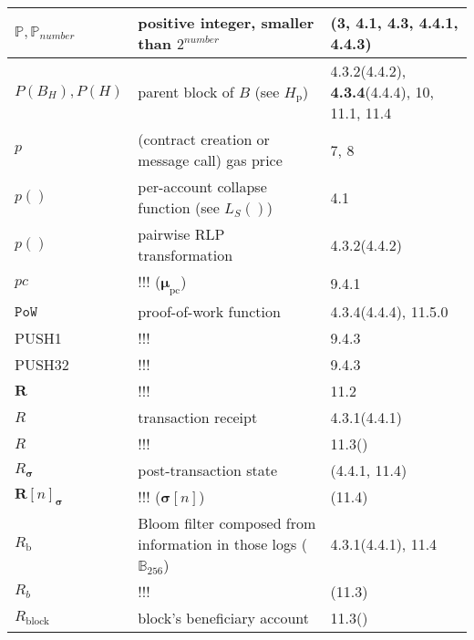 \documentclass[9pt,oneside]{amsart}
\newcommand{\reff}[1]{{\footnotesize #1}}
\begin{document}
\begin{longtabu}{X[1.2lm] X[3] X}
$\mathbb{P}, \mathbb{P}_{number}$ &
positive integer, smaller than $2^{number}$ &
\reff{(3, 4.1, \textbf{4.3}, 4.4.1, 4.4.3)} \\\hline

$P(B_H), P(H)$ &
parent block of $B$ (see $H_{\mathrm{p}}$) &
\reff{4.3.2(4.4.2), \textbf{4.3.4}(4.4.4), 10, 11.1, 11.4} \\\hline

$p$ &
(contract creation or message call) gas price &
\reff{7, 8} \\\hline

$p()$ &
per-account collapse function (see $L_{S}()$) &
\reff{4.1} \\\hline

$p()$ &
pairwise RLP transformation &
\reff{4.3.2(4.4.2)} \\\hline

$pc$ &
!!! ($\boldsymbol{\mu}_{\mathrm{pc}}$) &
\reff{9.4.1} \\\hline

$\mathtt{PoW}$ &
proof-of-work function &
\reff{4.3.4(4.4.4), 11.5.0} \\\hline

{\small PUSH1} &
!!! &
\reff{9.4.3} \\\hline

{\small PUSH32} &
!!! &
\reff{9.4.3} \\\hline

$\mathbf{R}$ &
!!! &
\reff{11.2} \\\hline

$R$ &
transaction receipt &
\reff{4.3.1(4.4.1)} \\\hline

$R$ &
!!! &
\reff{11.3()} \\\hline

$R_{\boldsymbol{\sigma}}$ &
post-transaction state &
\reff{(4.4.1, 11.4)} \\\hline

$\mathbf{R}[n]_{\boldsymbol{\sigma}}$ &
!!! ($\boldsymbol{\sigma}[n]$) &
\reff{(11.4)} \\\hline

$R_{\mathrm{b}}$ &
Bloom filter composed from information in those logs ($\mathbb{B}_{256}$) &
\reff{4.3.1(4.4.1), 11.4} \\\hline

$R_b$ &
!!! &
\reff{(11.3)} \\\hline

$R_{\mathrm{block}}$ &
block's beneficiary account &
\reff{11.3()} \\\hline


\end{longtabu}
\end{document}
